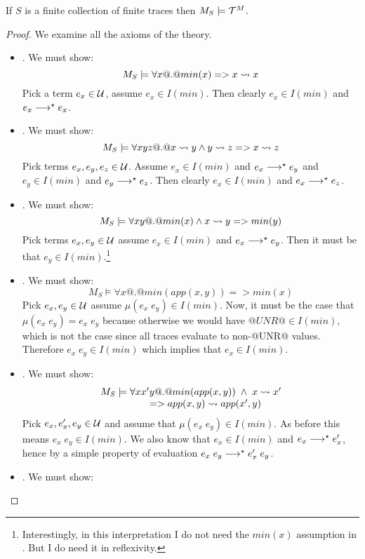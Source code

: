 \documentclass[preprint]{sigplanconf}
\begin{document}
\begin{theorem} If $S$ is a finite collection of finite traces then $M_S \models {\cal T}^M$.
\end{theorem}
\begin{proof}
We examine all the axioms of the theory.
\begin{itemize}
  \item {}. We must show: 
             \[ M_S \models \forall x @.@ min(x) => x \rightsquigarrow x \] 
        Pick a term $e_x \in {\cal U}$, assume $e_x \in I(min)$. Then clearly $e_x \in I(min)$ and $e_x \longrightarrow^{\star} e_x$.
  \item {}. We must show:
            \[ M_S \models \forall x y z @.@ x \rightsquigarrow y \land y \rightsquigarrow z => x \rightsquigarrow z \]
        Pick terms $e_x,e_y,e_z \in {\cal U}$. Assume $e_x \in I(min)$ and $e_x \longrightarrow^{\star} e_y$ and $e_y \in I(min)$ 
        and $e_y \longrightarrow^{\star} e_z$. Then clearly $e_x \in I(min)$ and $e_x \longrightarrow^{\star} e_z$.
  \item {}. We must show:
           \[ M_S \models \forall xy @.@ min(x) \land x \rightsquigarrow y => min(y) \]
        Pick terms $e_x,e_y \in {\cal U}$ assume $e_x \in I(min)$ and $e_x \longrightarrow^{\star} e_y$. Then it must be that
        $e_y \in I(min)$.\footnote{Interestingly, in this interpretation I do not need the $min(x)$ assumption 
        in . But I do need it in reflexivity.}
  \item {}. We must show:
          \[ M_S \models \forall x @.@ min(app(x,y)) => min(x) \]
        Pick $e_x,e_y \in {\cal U}$ assume $\mu(e_x\;e_y) \in I(min)$. Now, it must be the case that
        $\mu(e_x\;e_y) = e_x\;e_y$ because otherwise we would have $@UNR@ \in I(min)$, which is not the case
        since all traces evaluate to non-@UNR@ values. Therefore $e_x\;e_y \in I(min)$ which implies that 
        $e_x \in I(min)$.
  \item {}. We must show:
        \[\begin{array}{l}
               M_S \models \forall x x' y @.@ min(app(x,y))\;\land\;x \rightsquigarrow x' \\ 
               \qquad\qquad\quad => app(x,y) \rightsquigarrow app(x',y) 
        \end{array}\]
        Pick $e_x, e_x', e_y \in {\cal U}$ and assume that $\mu(e_x\;e_y) \in I(min)$. As before this means
        $e_x\;e_y \in I(min)$. We also know that $e_x \in I(min)$ and $e_x \longrightarrow^{\star} e_x'$, hence by a simple
        property of evaluation $e_x\;e_y \longrightarrow^{\star} e_x'\;e_y$. 
  \item {}. We must show:

\end{itemize}
\end{proof}
\end{document}
